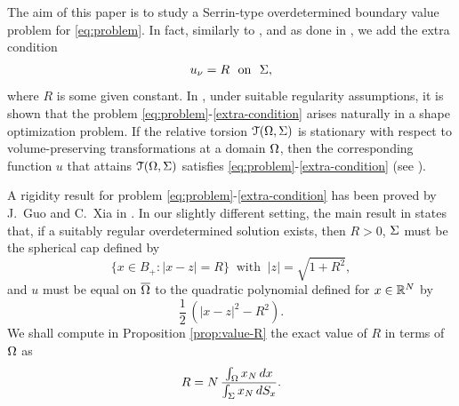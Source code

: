 \documentclass[a4paper,10pt]{amsart}
\numberwithin{equation}{section}
\begin{document}
The aim of this paper is to study a Serrin-type overdetermined boundary value problem for \eqref{eq:problem}. In fact, similarly to \cite{Se}, \cite{We} and as done in \cite{GX}, we add the extra condition
\begin{equation}
\label{extra-condition}
u_\nu=R \ \mbox{ on } \ \Sigma,
\end{equation}
where $R$ is some given constant. In \cite{GX}, under suitable regularity assumptions, it is shown that the problem \eqref{eq:problem}-\eqref{extra-condition} arises naturally in a shape optimization problem. If the relative torsion ${\mathcal T}(\Omega,\Sigma)$ is stationary with respect to volume-preserving transformations at a domain $\Omega$, then the corresponding function $u$ that attains ${\mathcal T}(\Omega,\Sigma)$ satisfies \eqref{eq:problem}-\eqref{extra-condition} (see \cite[Proposition 4.2]{GX}). 
\par
A rigidity result for problem \eqref{eq:problem}-\eqref{extra-condition} has been proved by J.~Guo and C.~Xia in \cite{GX}. In our slightly different setting, the main result in \cite{GX} states that, if a suitably regular overdetermined solution exists, then $R>0$, $\Sigma$ must be the spherical cap %
defined by
\begin{equation}
\label{spherical-cap}
\{ x\in B_+: |x-z|=R\} \ \mbox{ with } \ |z|=\sqrt{1+R^2},
\end{equation}
and $u$ must be equal on $\overline{\Omega}$ to the quadratic polynomial defined for $x\in\mathbb{R}^N$ by 
$$
\frac12\,(|x-z|^2-R^2).
$$
We shall compute in Proposition \ref{prop:value-R} the exact value of $R$ in terms of $\Omega$ as
\begin{equation}
\label{value-R-intro}
R=N\,\frac{\int_\Omega x_N\,dx}{\int_\Sigma x_N\,dS_x}.
\end{equation} 
\end{document}
